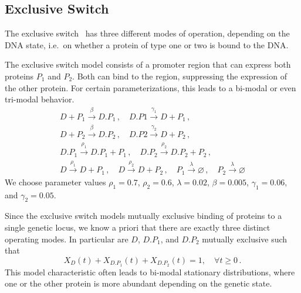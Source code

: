 
\subsection{Exclusive Switch}
The exclusive switch~\parencite{barzel2008calculation}  has three different modes of operation, depending on the
\ac{DNA} state, i.e.\ on whether a protein of type one or two is bound to
the \ac{DNA}.

\begin{model}\label{model:excl_switch}
The exclusive switch model consists of a promoter region
that can express both proteins $P_1$ and $P_2$. Both can bind to the region, suppressing
the expression of the other protein. For certain parameterizations, this leads to a
bi-modal or even tri-modal behavior.
\begin{gather*}
	D + P_1 \xrightarrow{\beta} D.P_1\,,\quad
	D.P1 \xrightarrow{\gamma_1} D + P_1  \,,\\
	D + P_2 \xrightarrow{\beta} D.P_2 \,,\quad
	D.P2 \xrightarrow{\gamma_2} D + P_2 \,,\\
	D.P_1 \xrightarrow{\rho_1} D.P_1 + P_1\,, \quad
    D.P_2 \xrightarrow{\rho_2} D.P_2 + P_2\,,\\
	D \xrightarrow{\rho_1} D + P_1\,,\quad
	D \xrightarrow{\rho_2} D + P_2\,,  \quad
	P_1 \xrightarrow{\lambda}\varnothing  \,,\quad
    P_2\xrightarrow{\lambda} \varnothing
\end{gather*}
We choose parameter values $\rho_1 = 0.7$, $\rho_2 = 0.6$, $\lambda=0.02$, $\beta=0.005$, $\gamma_1 = 0.06$, and $\gamma_2 = 0.05$.
\end{model}
Since the exclusive switch models mutually exclusive binding of proteins to a single genetic locus,
we know a priori that there are exactly three distinct operating modes.
In particular are $D$, $D.P_1$, and $D.P_2$ mutually exclusive such that \[X_{D}(t) + X_{D.P_1}(t) + X_{D.P_2}(t) = 1, \quad \forall t\geq 0\,.\]
This model characteristic often leads to bi-modal stationary distributions, where one or the other protein is more abundant depending on the genetic state.

